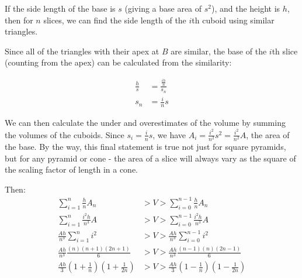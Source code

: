 \documentclass{article}
\begin{document}
If the side length of the base is $s$ (giving a base area of $s^2$), and the height is $h$, then for $n$ slices, we can find the side length of the $i$th cuboid using similar triangles. 

\begin{center}
\end{center}

Since all of the triangles with their apex at $B$ are similar, the base of the $i$th slice (counting from the apex) can be calculated from the similarity:

\begin{align*}
\frac{h}{s} &= \frac{\frac{ih}{n}}{s_n} \\
s_n &=\frac{i}{n}s 
\end{align*}

We can then calculate the under and overestimates of the volume by summing the volumes of the
cuboids. Since $s_i = \frac{i}{n}s$, we have $A_i = \frac{i^2}{n^2}s^2 = \frac{i^2}{n^2}A$,
the area of the base. By the way, this final statement is true not just for square pyramids, but
for any pyramid or cone - the area of a slice will always vary as the square of the scaling
factor of length in a cone.

Then:
\begin{align*}
\sum_{i=1}^{n} \frac{h}{n}A_n &> V > \sum_{i=0}^{n-1} \frac{h}{n}A_n \\
\sum_{i=1}^{n} \frac{i^2h}{n^3}A &> V > \sum_{i=0}^{n-1} \frac{i^2h}{n^3}A \\
\frac{Ah}{n^3} \sum_{i=1}^{n} i^2 &> V > \frac{Ah}{n^3} \sum_{i=0}^{n-1} i^2 \\
\frac{Ah}{n^3} \frac{(n)(n+1)(2n+1)}{6} &> V > \frac{Ah}{n^3} \frac{(n-1)(n)(2n-1)}{6} \\
\frac{Ah}{3} (1+\frac{1}{n})(1+\frac{1}{2n}) &> V > \frac{Ah}{3} (1-\frac{1}{n})(1-\frac{1}{2n})
\end{align*}
\end{document}
